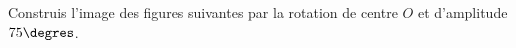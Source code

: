 %
%
Construis l'image des figures suivantes par la rotation de centre $O$ et d'amplitude $75\degres$.
